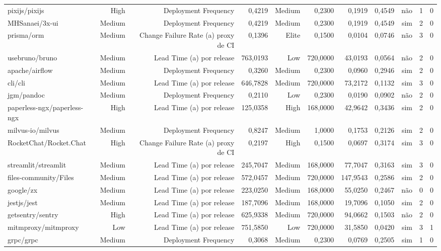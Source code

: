 \begin{tabular}{lrrrrrrrrrr}
pixijs/pixijs & High & Deployment Frequency & 0,4219 & Medium & 0,2300 & 0,1919 & 0,4549 & não & 1 & 0 \\
MHSanaei/3x-ui & Medium & Deployment Frequency & 0,4219 & Medium & 0,2300 & 0,1919 & 0,4549 & sim & 2 & 0 \\
prisma/orm & Medium & Change Failure Rate (a) proxy de CI & 0,1396 & Elite & 0,1500 & 0,0104 & 0,0746 & não & 3 & 0 \\
usebruno/bruno & Medium & Lead Time (a) por release & 763,0193 & Low & 720,0000 & 43,0193 & 0,0564 & não & 2 & 0 \\
apache/airflow & Medium & Deployment Frequency & 0,3260 & Medium & 0,2300 & 0,0960 & 0,2946 & sim & 2 & 0 \\
cli/cli & Medium & Lead Time (a) por release & 646,7828 & Medium & 720,0000 & 73,2172 & 0,1132 & sim & 3 & 0 \\
jgm/pandoc & Medium & Deployment Frequency & 0,2110 & Low & 0,2300 & 0,0190 & 0,0902 & não & 2 & 0 \\
paperless-ngx/paperless-ngx & High & Lead Time (a) por release & 125,0358 & High & 168,0000 & 42,9642 & 0,3436 & sim & 2 & 0 \\
milvus-io/milvus & Medium & Deployment Frequency & 0,8247 & Medium & 1,0000 & 0,1753 & 0,2126 & sim & 2 & 0 \\
RocketChat/Rocket.Chat & High & Change Failure Rate (a) proxy de CI & 0,2197 & High & 0,1500 & 0,0697 & 0,3174 & sim & 3 & 0 \\
streamlit/streamlit & Medium & Lead Time (a) por release & 245,7047 & Medium & 168,0000 & 77,7047 & 0,3163 & sim & 3 & 0 \\
files-community/Files & Medium & Lead Time (a) por release & 572,0457 & Medium & 720,0000 & 147,9543 & 0,2586 & sim & 2 & 0 \\
google/zx & Medium & Lead Time (a) por release & 223,0250 & Medium & 168,0000 & 55,0250 & 0,2467 & não & 0 & 0 \\
jestjs/jest & Medium & Lead Time (a) por release & 187,7096 & Medium & 168,0000 & 19,7096 & 0,1050 & sim & 2 & 0 \\
getsentry/sentry & High & Lead Time (a) por release & 625,9338 & Medium & 720,0000 & 94,0662 & 0,1503 & não & 2 & 0 \\
mitmproxy/mitmproxy & Low & Lead Time (a) por release & 751,5850 & Low & 720,0000 & 31,5850 & 0,0420 & sim & 3 & 1 \\
grpc/grpc & Medium & Deployment Frequency & 0,3068 & Medium & 0,2300 & 0,0769 & 0,2505 & sim & 1 & 0 \\

\end{tabular}
